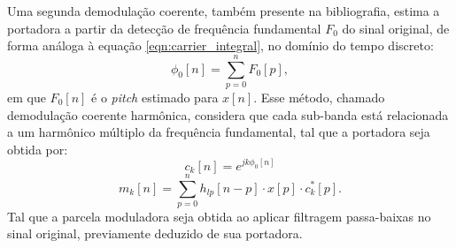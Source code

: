 Uma segunda demodulação coerente, também presente na bibliografia, estima a
portadora a partir da detecção de frequência fundamental $F_0$ do sinal
original, de forma análoga à equação \ref{eqn:carrier_integral}, no domínio do
tempo discreto:
\begin{equation}
    \phi_0[n] = \sum_{p=0}^n F_0[p],
\end{equation}
em que $F_0[n]$ é o \textit{pitch} estimado para $x[n]$. Esse método, chamado
demodulação coerente harmônica, considera que cada sub-banda está relacionada a
um harmônico múltiplo da frequência fundamental, tal que a portadora seja obtida
por:
\begin{equation}
    c_k[n] = e^{jk\phi_0[n]}
\end{equation}
\begin{equation}
    m_k[n] = \sum^n_{p=0} h_{lp}[n-p] \cdot x[p] \cdot c^*_k[p].
\end{equation}
Tal que a parcela moduladora seja obtida ao aplicar filtragem passa-baixas no
sinal original, previamente deduzido de sua portadora.